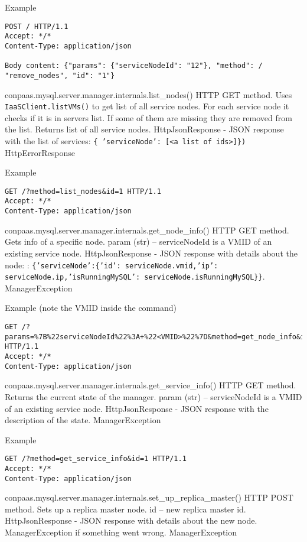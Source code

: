 \documentclass[a4paper,10pt]{article}
\begin{document}
Example
\begin{Verbatim}[frame=single]
POST / HTTP/1.1
Accept: */*
Content-Type: application/json

Body content: {"params": {"serviceNodeId": "12"}, "method": /
"remove_nodes", "id": "1"}
\end{Verbatim}

\noindent\conapi
{ conpaas.mysql.server.manager.internals.list\_nodes()}
{ HTTP GET method. Uses {\tt IaaSClient.listVMs()} to get list of all service nodes. For each service node it checks if it is in servers list. If some of them are missing they are removed from the list. Returns list of all service nodes.}
{}
{HttpJsonResponse - JSON response with the list of services: {\tt \{ 'serviceNode': [<a list of ids>]\})}}
{HttpErrorResponse}

Example
\begin{Verbatim}[frame=single]
GET /?method=list_nodes&id=1 HTTP/1.1
Accept: */*
Content-Type: application/json
\end{Verbatim}

\noindent\conapi
{ conpaas.mysql.server.manager.internals.get\_node\_info()}
{HTTP GET method. Gets info of a specific node.}
{param (str) -- serviceNodeId is a VMID of an existing service node.}
{HttpJsonResponse - JSON response with details about the node: : {\tt \{'serviceNode':\{'id': serviceNode.vmid,'ip': serviceNode.ip,'isRunningMySQL': serviceNode.isRunningMySQL\}\}}.}
{ManagerException}

Example (note the VMID inside the command)
\begin{Verbatim}[frame=single]
GET /?params=%7B%22serviceNodeId%22%3A+%22<VMID>%22%7D&method=get_node_info&id=1 HTTP/1.1
Accept: */*
Content-Type: application/json
\end{Verbatim}

\noindent\conapi
{ conpaas.mysql.server.manager.internals.get\_service\_info()}
{HTTP GET method. Returns the current state of the manager.}
{param (str) -- serviceNodeId is a VMID of an existing service node.}
{HttpJsonResponse - JSON response with the description of the state.}
{ManagerException}

Example
\begin{Verbatim}[frame=single]
GET /?method=get_service_info&id=1 HTTP/1.1
Accept: */*
Content-Type: application/json
\end{Verbatim}

\noindent\conapi
{ conpaas.mysql.server.manager.internals.set\_up\_replica\_master()}
{HTTP POST method. Sets up a replica master node.}
{ id -- new replica master id.}
{HttpJsonResponse - JSON response with details about the new
      node. ManagerException if something went wrong.}
{ManagerException}
     
\end{document}
